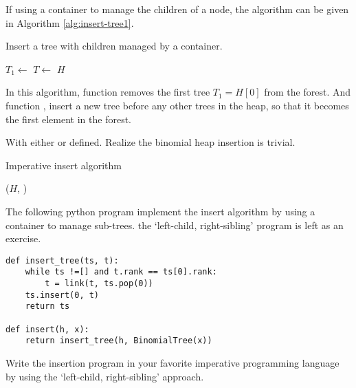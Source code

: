 \documentclass{article}
\begin{document}
If using a container to manage the children of a node, the algorithm
can be given in Algorithm \ref{alg:insert-tree1}.

\begin{algorithm}
\caption{Insert a tree with children managed by a container.}
\label{alg:insert-tree1}
\begin{algorithmic}[1]
    \State $T_1 \gets$ 
    \State $T \gets $ 
  \EndWhile
  \State {}
  \State \Return $H$
\EndFunction
\end{algorithmic}
\end{algorithm}

In this algorithm, function  removes the first tree
$T_1 = H[0]$ from the forest. And function ,
insert a new tree before any other trees in the heap, so that it
becomes the first element in the forest.

With either  or  defined.
Realize the binomial heap insertion is trivial.

\begin{algorithm}
\caption{Imperative insert algorithm}
\label{alg:bheap-insert}
\begin{algorithmic}[1]
  \State \Return {}($H$, )
\EndFunction
\end{algorithmic}
\end{algorithm}

The following python program implement the insert algorithm by using
a container to manage sub-trees. the `left-child, right-sibling' program
is left as an exercise.

\lstset{language=Python}
\begin{lstlisting}
def insert_tree(ts, t):
    while ts !=[] and t.rank == ts[0].rank:
        t = link(t, ts.pop(0))
    ts.insert(0, t)
    return ts

def insert(h, x):
    return insert_tree(h, BinomialTree(x))
\end{lstlisting}

\begin{Exercise}
Write the insertion program in your favorite imperative programming
language by using the `left-child, right-sibling' approach.
\end{Exercise}

\end{document}
